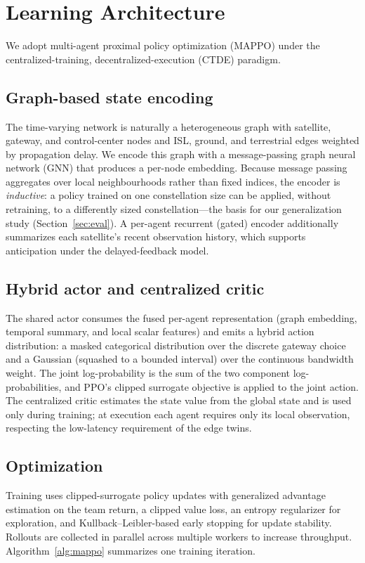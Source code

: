 \documentclass[11pt]{article}
\begin{document}
\section{Learning Architecture}
\label{sec:arch}

We adopt multi-agent proximal policy optimization (MAPPO) under the
centralized-training, decentralized-execution (CTDE) paradigm.

\subsection{Graph-based state encoding}
The time-varying network is naturally a heterogeneous graph with satellite,
gateway, and control-center nodes and ISL, ground, and terrestrial edges weighted
by propagation delay. We encode this graph with a message-passing graph neural
network (GNN) that produces a per-node embedding. Because message passing
aggregates over local neighbourhoods rather than fixed indices, the encoder is
\emph{inductive}: a policy trained on one constellation size can be applied,
without retraining, to a differently sized constellation---the basis for our
generalization study (Section~\ref{sec:eval}). A per-agent recurrent (gated)
encoder additionally summarizes each satellite's recent observation history, which
supports anticipation under the delayed-feedback model.

\subsection{Hybrid actor and centralized critic}
The shared actor consumes the fused per-agent representation (graph embedding,
temporal summary, and local scalar features) and emits a hybrid action
distribution: a masked categorical distribution over the discrete gateway choice
and a Gaussian (squashed to a bounded interval) over the continuous bandwidth
weight. The joint log-probability is the sum of the two component
log-probabilities, and PPO's clipped surrogate objective is applied to the joint
action. The centralized critic estimates the state value from the global state and
is used only during training; at execution each agent requires only its local
observation, respecting the low-latency requirement of the edge twins.

\subsection{Optimization}
Training uses clipped-surrogate policy updates with generalized advantage
estimation on the team return, a clipped value loss, an entropy regularizer for
exploration, and Kullback--Leibler-based early stopping for update stability.
Rollouts are collected in parallel across multiple workers to increase throughput.
Algorithm~\ref{alg:mappo} summarizes one training iteration.
\end{document}
